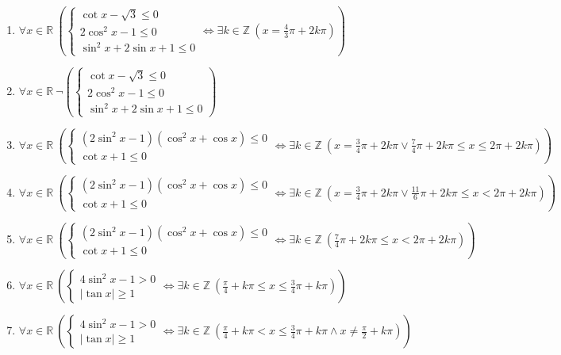 \documentclass[11pt,a4paper]{article}
\begin{document}
\begin{enumerate}
\item $\displaystyle \forall x \in \mathbb{R}\ \left( \begin{cases} \cot x - \sqrt{3} \le 0 \\ 2\cos^{2} x - 1 \le 0 \\ \sin^{2} x + 2\sin x + 1 \le 0 \end{cases} \iff \exists k \in \mathbb{Z}\ \left( x = \frac{4}{3}\pi + 2k\pi \right) \right)$
\item $\displaystyle \forall x \in \mathbb{R}\ \lnot \left( \begin{cases} \cot x - \sqrt{3} \le 0 \\ 2\cos^{2} x - 1 \le 0 \\ \sin^{2} x + 2\sin x + 1 \le 0 \end{cases} \right)$
\item $\displaystyle \forall x \in \mathbb{R}\ \left( \begin{cases} (2\sin^{2} x - 1)(\cos^{2} x + \cos x) \le 0 \\ \cot x + 1 \le 0 \end{cases} \iff \exists k \in \mathbb{Z}\ \left( x = \frac{3}{4}\pi + 2k\pi \lor \frac{7}{4}\pi + 2k\pi \le x \le 2\pi + 2k\pi \right) \right)$
\item $\displaystyle \forall x \in \mathbb{R}\ \left( \begin{cases} (2\sin^{2} x - 1)(\cos^{2} x + \cos x) \le 0 \\ \cot x + 1 \le 0 \end{cases} \iff \exists k \in \mathbb{Z}\ \left( x = \frac{3}{4}\pi + 2k\pi \lor \frac{11}{6}\pi + 2k\pi \le x < 2\pi + 2k\pi \right) \right)$
\item $\displaystyle \forall x \in \mathbb{R}\ \left( \begin{cases} (2\sin^{2} x - 1)(\cos^{2} x + \cos x) \le 0 \\ \cot x + 1 \le 0 \end{cases} \iff \exists k \in \mathbb{Z}\ \left( \frac{7}{4}\pi + 2k\pi \le x < 2\pi + 2k\pi \right) \right)$
\item $\displaystyle \forall x \in \mathbb{R}\ \left( \begin{cases} 4\sin^{2} x - 1 > 0 \\ \left|\tan x\right| \ge 1 \end{cases} \iff \exists k \in \mathbb{Z}\ \left( \frac{\pi}{4} + k\pi \le x \le \frac{3}{4}\pi + k\pi \right) \right)$
\item $\displaystyle \forall x \in \mathbb{R}\ \left( \begin{cases} 4\sin^{2} x - 1 > 0 \\ \left|\tan x\right| \ge 1 \end{cases} \iff \exists k \in \mathbb{Z}\ \left( \frac{\pi}{4} + k\pi < x \le \frac{3}{4}\pi + k\pi \land x \neq \frac{\pi}{2} + k\pi \right) \right)$

\end{enumerate}
\end{document}
